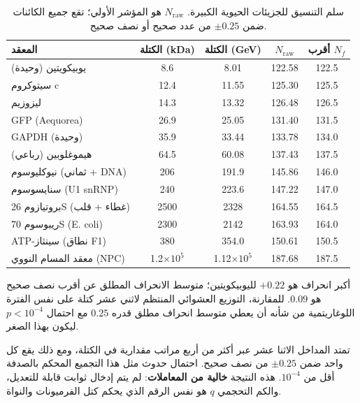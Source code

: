 \documentclass[11pt,a4paper]{article}
\begin{document}
	\begin{table}[H]
		\centering
		\caption{سلم التنسيق للجزيئات الحيوية الكبيرة. \(N_{\mathrm{raw}}\) هو المؤشر الأولي؛ تقع جميع الكائنات ضمن \(\pm 0.25\) من عدد صحيح أو نصف صحيح.}
		\label{tab:protein_masses}
		\small
		\begin{tabular}{l c c c c}
			\toprule
			المعقد & الكتلة (kDa) & الكتلة (GeV) & \(N_{\mathrm{raw}}\) & أقرب \(N_f\) \\
			\midrule
			يوبيكويتين (وحيدة)          & 8.6   & 8.01  & 122.58 & 122.5 \\
			سيتوكروم c                 & 12.4  & 11.55 & 125.30 & 125.5 \\
			ليزوزيم                     & 14.3  & 13.32 & 126.48 & 126.5 \\
			GFP (Aequorea)               & 26.9  & 25.05 & 131.40 & 131.5 \\
			GAPDH (وحيدة)              & 35.9  & 33.44 & 133.78 & 134.0 \\
			هيموغلوبين (رباعي)       & 64.5  & 60.08 & 137.43 & 137.5 \\
			نيوكليوسوم (ثماني + DNA)   & 206   & 191.9 & 145.86 & 146.0 \\
			سنايسوسوم (U1 snRNP)       & 240   & 223.6 & 147.22 & 147.0 \\
			بروتيازوم 26S (غطاء + قلب)  & 2500  & 2328  & 164.55 & 164.5 \\
			ريبوسوم 70S (E. coli)       & 2300  & 2142  & 163.93 & 164.0 \\
			ATP-سينثاز (نطاق F1)     & 380   & 354.0 & 150.61 & 150.5 \\
			معقد المسام النووي (NPC)   & 1.2\(\times10^5\) & 1.12\(\times10^5\) & 187.68 & 187.5 \\
			\bottomrule
		\end{tabular}
		\par\smallskip
		\footnotesize
		أكبر انحراف هو \(+0.22\) لليوبيكويتين؛ متوسط الانحراف المطلق عن أقرب نصف صحيح هو \(0.09\). للمقارنة، التوزيع العشوائي المنتظم لاثني عشر كتلة على نفس الفترة اللوغاريتمية من شأنه أن يعطي متوسط انحراف مطلق قدره \(0.25\) مع احتمال \(p < 10^{-4}\) ليكون بهذا الصغر.
	\end{table}
	
	تمتد المداخل الاثنا عشر عبر أكثر من أربع مراتب مقدارية في الكتلة، ومع ذلك يقع كل واحد ضمن \(\pm 0.25\) من نصف صحيح. احتمال حدوث مثل هذا التجميع المحكم بالصدفة أقل من \(10^{-4}\). هذه النتيجة \textbf{خالية من المعاملات}: لم يتم إدخال ثوابت قابلة للتعديل، والكم التحجمي \(q\) هو نفس الرقم الذي يحكم كتل الفرميونات والنواة.
	
\end{document}
